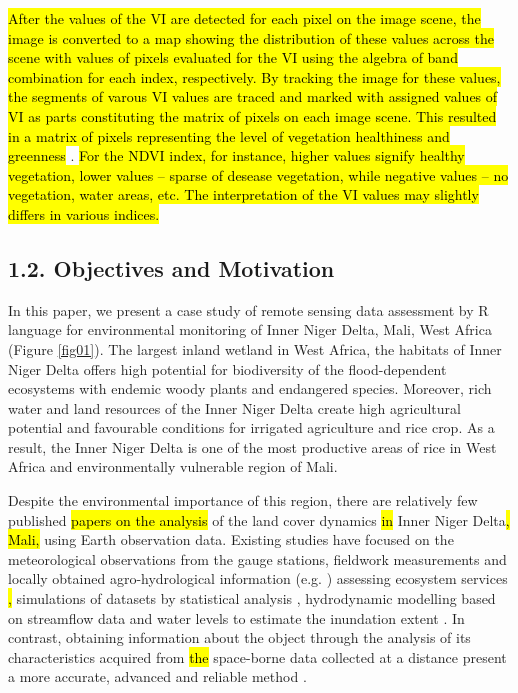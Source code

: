 \documentclass[12pt,a4paper,oneside]{article}
\def \newpar{\vspace{6pt}}
\begin{document}
\newpar \hl{After the values of the VI are detected for each pixel on the image scene, the image is converted to a map showing the distribution of these values across the scene with values of pixels evaluated for the VI using the algebra of band combination for each index, respectively. By tracking the image for these values, the segments of varous VI values are traced and marked with assigned values of VI as parts constituting the matrix of pixels on each image scene. This resulted in a matrix of pixels representing the level of vegetation healthiness and greenness} \cite{agronomy9050238}. \hl{For the NDVI index, for instance, higher values signify healthy vegetation, lower values -- sparse of desease vegetation, while negative values -- no vegetation, water areas, etc. The interpretation of the VI values may slightly differs in various indices.}

\subsection*{1.2. Objectives and Motivation}

\newpar In this paper, we present a case study of remote sensing data assessment by R language for environmental monitoring of Inner Niger Delta, Mali, West Africa (Figure \ref{fig01}). The largest inland wetland in West Africa, the habitats of Inner Niger Delta offers high potential for biodiversity of the flood-dependent ecosystems with endemic woody plants and endangered species. Moreover, rich water and land resources of the Inner Niger Delta create high agricultural potential and favourable conditions for irrigated agriculture and rice crop. As a result, the Inner Niger Delta is one of the most productive areas of rice in West Africa and environmentally vulnerable region of Mali.

\newpar Despite the environmental importance of this region, there are relatively few published \hl{papers on the analysis} of the land cover dynamics \hl{in} Inner Niger Delta\hl{, Mali,} using Earth observation data. Existing studies have focused on the meteorological observations from the gauge stations, fieldwork measurements and locally obtained agro-hydrological information (e.g. \citep{dadson2010wetland}) assessing ecosystem services \citep{REBELO201358}\hl{, }simulations of datasets by statistical analysis \cite{Mascaro}, hydrodynamic modelling based on streamflow data and water levels to estimate the inundation extent \citep{HAQUE2020100703,HAQUE2021104187}. In contrast, obtaining information about the object through the analysis of its characteristics acquired from \hl{the }space-borne data collected at a distance present a more accurate, advanced and reliable method \citep{Maini,rs70202127}. 
\end{document}
